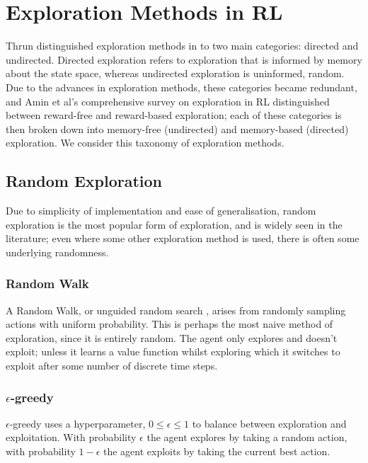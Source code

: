 \section{Exploration Methods in RL}
Thrun \cite{Thrun-1992-15850} distinguished exploration methods in to two main categories: directed and undirected. Directed exploration refers to exploration that is informed by memory about the state space, whereas undirected exploration is uninformed, random. Due to the advances in exploration methods, these categories became redundant, and Amin et al's \cite{DBLP:journals/corr/abs-2109-00157} comprehensive survey on exploration in RL distinguished between reward-free and reward-based exploration; each of these categories is then broken down into memory-free (undirected) and memory-based (directed) exploration. We consider this taxonomy of exploration methods.
\subsection{Random Exploration}
Due to simplicity of implementation and ease of generalisation, random exploration is the most popular form of exploration, and is widely seen in the literature; even where some other exploration method is used, there is often some underlying randomness.
\subsubsection{Random Walk}
A Random Walk, or unguided random search \cite{anderson86}, arises from randomly sampling actions with uniform probability. This is perhaps the most naive method of exploration, since it is entirely random. The agent only explores and doesn't exploit; unless it learns a value function whilst exploring which it switches to exploit after some number of discrete time steps.
\subsubsection{$\epsilon$-greedy}
$\epsilon$-greedy \cite{Watkins:1989, conf/nips/Sutton95} uses a hyperparameter, $0 \le \epsilon \le 1$ to balance between exploration and exploitation. With probability $\epsilon$ the agent explores by taking a random action, with probability $1-\epsilon$ the agent exploits by taking the current best action.
